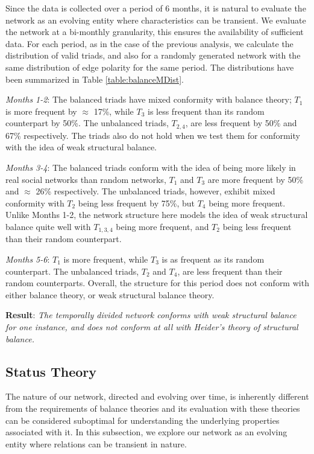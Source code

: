 Since the data is collected over a period of 6 months, it is natural to evaluate the network as an evolving entity where characteristics can be transient. 
We evaluate the network at a bi-monthly granularity, this ensures the availability of sufficient data.  
For each period, as in the case of the previous analysis, we calculate the distribution of valid triads, and also for a randomly generated network with the same distribution of edge polarity for the same period.  
The distributions have been summarized in Table \ref{table:balanceMDist}. 

\textit{Months 1-2}: The balanced triads have mixed conformity with balance theory; $T_1$ is more frequent by $\approx$ 17\%, while $T_3$ is less frequent than its random counterpart by 50\%. 
The unbalanced triads, $T_{2, 4}$, are less frequent by 50\% and 67\% respectively. 
The triads also do not hold when we test them for conformity with the idea of weak structural balance.

\textit{Months 3-4}: The balanced triads conform with the idea of being more likely in real social networks than random networks, $T_1$ and $T_3$ are more frequent by 50\% and $\approx$ 26\% respectively. 
The unbalanced triads, however, exhibit mixed conformity with $T_2$ being less frequent by 75\%, but $T_4$ being more frequent. 
Unlike Months 1-2, the network structure here models the idea of weak structural balance quite well with $T_{1,3,4}$ being more frequent, and $T_2$ being less frequent than their random counterpart. 

\textit{Months 5-6}: $T_1$ is more frequent, while $T_3$ is as frequent as its random counterpart. 
The unbalanced triads, $T_2$ and $T_4$, are less frequent than their random counterparts. 
Overall, the structure for this period does not conform with either balance theory, or weak structural balance theory. 

\textbf{Result}: \textit{The temporally divided network conforms with weak structural balance for one instance, and does not conform at all with Heider's theory of structural balance.}

\subsection{Status Theory}
The nature of our network, directed and evolving over time, is inherently different from the requirements of balance theories and its evaluation with these theories can be considered suboptimal for understanding the underlying properties associated with it. 
In this subsection, we explore our network as an evolving entity where relations can be transient in nature. 